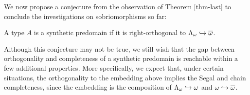 We now propose a conjecture from the observation of Theorem \ref{thm-last} to conclude the investigations on sobriomorphisms so far:
\begin{conjecture}
    \label{hypo-last}
    A type $A$ is a synthetic predomain if it is right-orthogonal to $\Lambda_\omega\hookrightarrow\overline{\omega}$.
\end{conjecture}
Although this conjecture may not be true, we still wish that the gap between orthogonality and completeness of a synthetic predomain is reachable within a few additional properties. More specifically, we expect that, under certain situations, the orthogonality to the embedding above implies the Segal and chain completeness, since the embedding is the composition of $\Lambda_\omega\hookrightarrow\omega$ and $\omega\hookrightarrow\overline{\omega}$.
